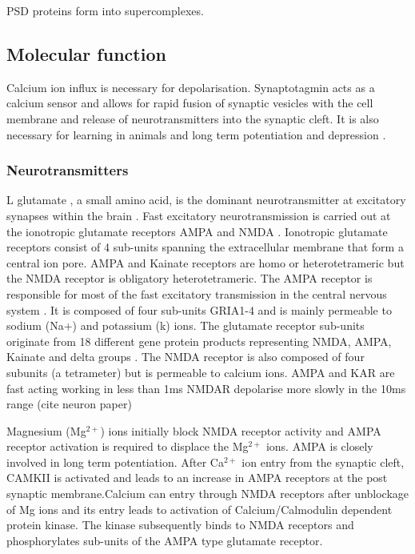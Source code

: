 PSD proteins form into supercomplexes. 





\subsection{Molecular function}
Calcium ion influx is necessary for depolarisation. Synaptotagmin acts as a calcium sensor and allows for rapid fusion of synaptic vesicles with the cell membrane and release of neurotransmitters into the synaptic cleft.\cite{martens2007synaptotagmin}  It is also necessary for  learning in animals and long term potentiation and depression \cite{lisman2012mechanisms}.
\subsubsection{Neurotransmitters}
\label{sec:Neurotransmitters}
L glutamate , a small amino acid, is the dominant neurotransmitter at excitatory synapses within the brain \cite{niswender2010metabotropic}. Fast excitatory neurotransmission is carried out at the ionotropic glutamate receptors AMPA and NMDA \cite{traynelis2010glutamate}. Ionotropic glutamate receptors consist of 4 sub-units spanning the extracellular membrane that form a central ion pore. AMPA and Kainate receptors are homo or heterotetrameric but the NMDA receptor is obligatory heterotetrameric. The AMPA receptor is responsible for most of the fast excitatory transmission in the central nervous system \cite{henley2013ampa}. It is composed of four sub-units GRIA1-4 and is mainly permeable to sodium (Na+) and potassium (k) ions. The glutamate receptor sub-units originate from 18 different gene protein products representing NMDA, AMPA, Kainate and delta groups \cite{traynelis2010glutamate}. The NMDA receptor is also composed of four subunits (a tetrameter)  but is permeable to calcium ions. AMPA and KAR are fast acting working in less than 1ms \cite{traynelis2010glutamate} NMDAR depolarise more slowly in the 10ms range (cite neuron paper) 

Magnesium (Mg$^{2+}$) ions initially block NMDA receptor activity and  AMPA receptor activation is required to displace the Mg$^{2+}$ ions. AMPA is closely involved in long term potentiation. After Ca$^{2+}$ ion entry from the synaptic cleft, CAMKII is activated and leads to an increase in AMPA receptors at the post synaptic membrane.Calcium can entry through NMDA receptors after unblockage of Mg ions and its entry leads to activation of Calcium/Calmodulin dependent protein kinase. The kinase subsequently binds to NMDA receptors and phosphorylates sub-units of the AMPA type glutamate receptor.

